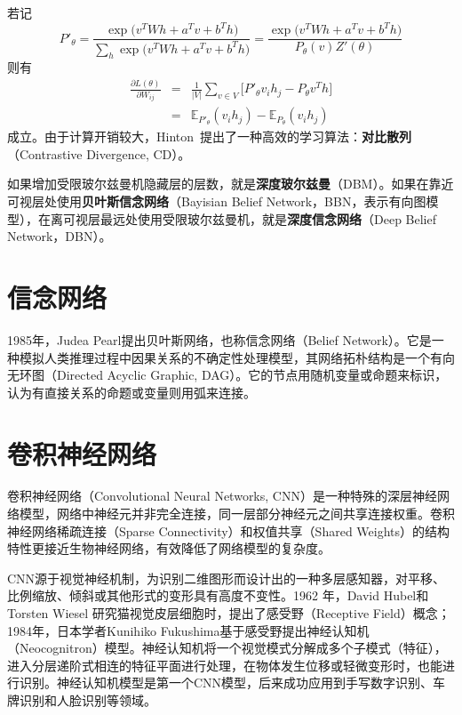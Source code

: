 若记
\begin{equation}
    P'_{\theta} = \frac{\exp\big(v^T W h + a^T v + b^T h\big)}{\sum\limits_{h} \exp\big(v^T W h + a^T v + b^T h\big)} = \frac{\exp\big(v^T W h + a^T v + b^T h\big)}{P_{\theta}(v) Z'(\theta)}
\end{equation}
则有
\begin{equation}
    \begin{array}{lll}
      \frac{\partial L(\theta)}{\partial W_{ij}} & = & \frac{1}{|V|} \sum\limits_{v\in V} \bigg[P'_{\theta} v_i h_j - P_{\theta}v^T h\bigg] \\
      & = & \mathbb{E}_{P'_{\theta}} (v_i h_j) - \mathbb{E}_{P_{\theta}} (v_i h_j)
   \end{array}
\end{equation}
成立。由于计算开销较大，Hinton~\cite{hinton2002training}提出了一种高效的学习算法：\textbf{对比散列}（Contrastive Divergence, CD）。

如果增加受限玻尔兹曼机隐藏层的层数，就是\textbf{深度玻尔兹曼}（DBM）。如果在靠近可视层处使用\textbf{贝叶斯信念网络}（Bayisian Belief Network，BBN，表示有向图模型），在离可视层最远处使用受限玻尔兹曼机，就是\textbf{深度信念网络}（Deep Belief Network，DBN）。

\section{信念网络}
1985年，Judea Pearl提出贝叶斯网络，也称信念网络（Belief Network）。它是一种模拟人类推理过程中因果关系的不确定性处理模型，其网络拓朴结构是一个有向无环图（Directed Acyclic Graphic, DAG）。它的节点用随机变量或命题来标识，认为有直接关系的命题或变量则用弧来连接。

\section{卷积神经网络}
卷积神经网络（Convolutional Neural Networks, CNN）是一种特殊的深层神经网络模型，网络中神经元并非完全连接，同一层部分神经元之间共享连接权重。卷积神经网络稀疏连接（Sparse Connectivity）和权值共享（Shared Weights）的结构特性更接近生物神经网络，有效降低了网络模型的复杂度。

CNN源于视觉神经机制，为识别二维图形而设计出的一种多层感知器，对平移、比例缩放、倾斜或其他形式的变形具有高度不变性。1962 年，David Hubel和Torsten Wiesel 研究猫视觉皮层细胞时，提出了感受野（Receptive Field）概念；1984年，日本学者Kunihiko Fukushima基于感受野提出神经认知机（Neocognitron）模型。神经认知机将一个视觉模式分解成多个子模式（特征），进入分层递阶式相连的特征平面进行处理，在物体发生位移或轻微变形时，也能进行识别。神经认知机模型是第一个CNN模型，后来成功应用到手写数字识别、车牌识别和人脸识别等领域。

